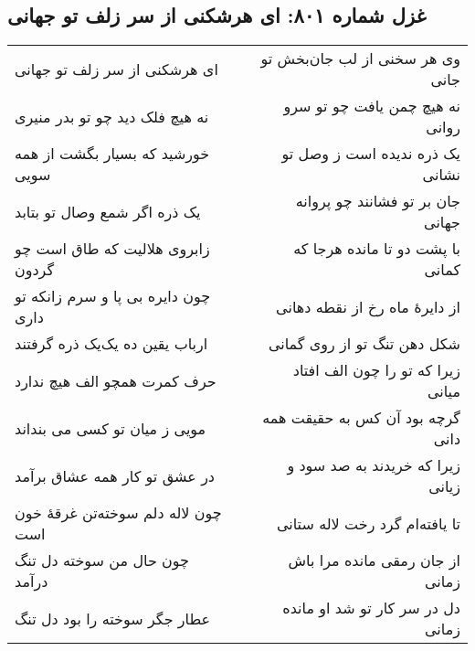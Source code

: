\begin{center}
\section*{غزل شماره ۸۰۱: ای هرشکنی از سر زلف تو جهانی}
\label{sec:801}
\begin{longtable}{l p{0.5cm} r}
ای هرشکنی از سر زلف تو جهانی
&&
وی هر سخنی از لب جان‌بخش تو جانی
\\
نه هیچ فلک دید چو تو بدر منیری
&&
نه هیچ چمن یافت چو تو سرو روانی
\\
خورشید که بسیار بگشت از همه سویی
&&
یک ذره ندیده است ز وصل تو نشانی
\\
یک ذره اگر شمع وصال تو بتابد
&&
جان بر تو فشانند چو پروانه جهانی
\\
زابروی هلالیت که طاق است چو گردون
&&
با پشت دو تا مانده هرجا که کمانی
\\
چون دایره بی پا و سرم زانکه تو داری
&&
از دایرهٔ ماه رخ از نقطه دهانی
\\
ارباب یقین ده یک‌یک ذره گرفتند
&&
شکل دهن تنگ تو از روی گمانی
\\
حرف کمرت همچو الف هیچ ندارد
&&
زیرا که تو را چون الف افتاد میانی
\\
مویی ز میان تو کسی می بنداند
&&
گرچه بود آن کس به حقیقت همه دانی
\\
در عشق تو کار همه عشاق برآمد
&&
زیرا که خریدند به صد سود و زیانی
\\
چون لاله دلم سوخته‌تن غرقهٔ خون است
&&
تا یافته‌ام گرد رخت لاله ستانی
\\
چون حال من سوخته دل تنگ درآمد
&&
از جان رمقی مانده مرا باش زمانی
\\
عطار جگر سوخته را بود دل تنگ
&&
دل در سر کار تو شد او مانده زمانی
\\
\end{longtable}
\end{center}
